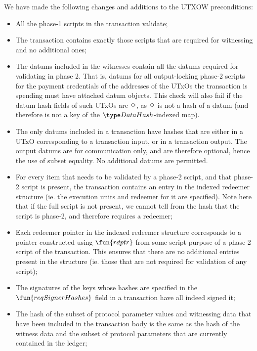 We have made the following changes and additions to the UTXOW preconditions:

\begin{itemize}

\item All the phase-1 scripts in the transaction validate;

\item The transaction contains exactly those scripts that are required for witnessing and no
additional ones;

    \item The datums included in the witnesses contain all the datums required for
    validating in phase 2. That is,
    datums for all output-locking phase-2 scripts for the payment credentials of the addresses of the
    UTxOs the transaction is spending must have attached datum objects. This check will also fail if
    the datum hash fields of such UTxOs are $\Diamond$, as $\Diamond$ is not a
    hash of a datum (and therefore is not a key of the $\DataHash$-indexed map).

    \item The only datums included in a transaction have hashes that are either in a UTxO
    corresponding to a transaction input, or in a transaction output. The
    output datums are for communication only, and are therefore optional, hence
    the use of subset equality. No additional
    datums are permitted.

    \item For every item that needs to be validated by a phase-2 script, and that
    phase-2 script is present, the transaction contains
      an entry in the indexed redeemer structure (ie. the execution units and redeemer for it are specified).
      Note here that if the full script is not present, we cannot tell from the hash
      that the script is phase-2, and therefore requires a redeemer;

    \item Each redeemer pointer in the indexed redeemer structure corresponds to
    a pointer constructed using $\fun{rdptr}$ from some script purpose of a phase-2
    script of the transaction.
    This ensures that there are no additional entries present in the structure
    (ie. those that are not required for validation of any script);

    \item The signatures of the keys whose hashes are specified in the
    $\fun{reqSignerHashes}$ field in a transaction
    have all indeed signed it;

    \item
    The hash of the subset of protocol parameter values and witnessing data that have been included in the
    transaction body is the same as
    the hash of the witness data and the subset of protocol parameters that are currently contained in the ledger;
\end{itemize}

